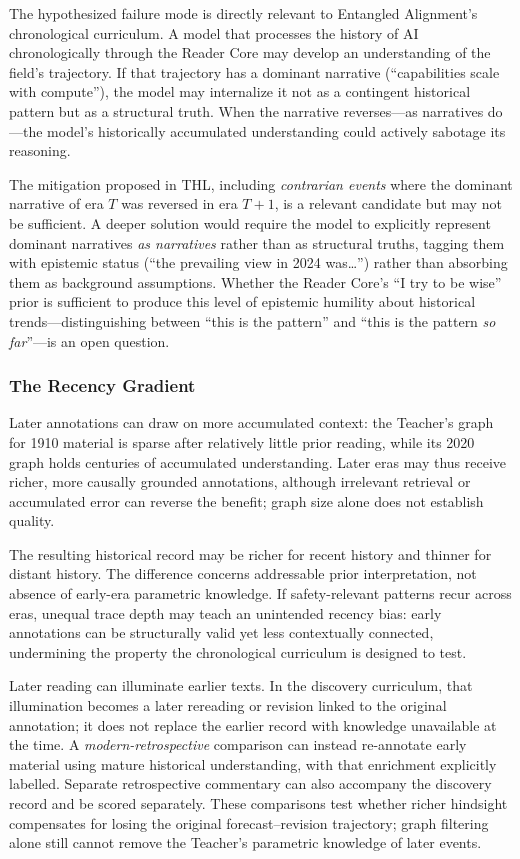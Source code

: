\documentclass[11pt]{article}
\begin{document}
The hypothesized failure mode is directly relevant to Entangled Alignment's chronological curriculum. A model that processes the history of AI chronologically through the Reader Core may develop an understanding of the field's trajectory. If that trajectory has a dominant narrative (``capabilities scale with compute''), the model may internalize it not as a contingent historical pattern but as a structural truth. When the narrative reverses---as narratives do---the model's historically accumulated understanding could actively sabotage its reasoning.

The mitigation proposed in THL, including \emph{contrarian events} where the dominant narrative of era $T$ was reversed in era $T+1$, is a relevant candidate but may not be sufficient. A deeper solution would require the model to explicitly represent dominant narratives \emph{as narratives} rather than as structural truths, tagging them with epistemic status (``the prevailing view in 2024 was\ldots'') rather than absorbing them as background assumptions. Whether the Reader Core's ``I try to be wise'' prior is sufficient to produce this level of epistemic humility about historical trends---distinguishing between ``this is the pattern'' and ``this is the pattern \emph{so far}''---is an open question.

\subsubsection{The Recency Gradient}

Later annotations can draw on more accumulated context: the Teacher's graph
for 1910 material is sparse after relatively little prior reading, while its
2020 graph holds centuries of accumulated understanding. Later eras may thus
receive richer, more causally grounded annotations, although irrelevant
retrieval or accumulated error can reverse the benefit; graph size alone does
not establish quality.

The resulting historical record may be richer for recent history and thinner
for distant history. The difference concerns addressable prior interpretation,
not absence of early-era parametric knowledge. If safety-relevant patterns recur
across eras, unequal trace depth may teach an unintended recency bias: early
annotations can be structurally valid yet less contextually connected,
undermining the property the chronological curriculum is designed to test.

Later reading can illuminate earlier texts. In the discovery curriculum,
that illumination becomes a later rereading or revision linked to the original
annotation; it does not replace the earlier record with knowledge unavailable
at the time. A \emph{modern-retrospective} comparison can instead re-annotate
early material using mature historical understanding, with that enrichment
explicitly labelled. Separate retrospective commentary can also accompany the
discovery record and be scored separately. These comparisons test whether
richer hindsight compensates for losing the original forecast--revision
trajectory; graph filtering alone still cannot remove the Teacher's
parametric knowledge of later events.
\end{document}
